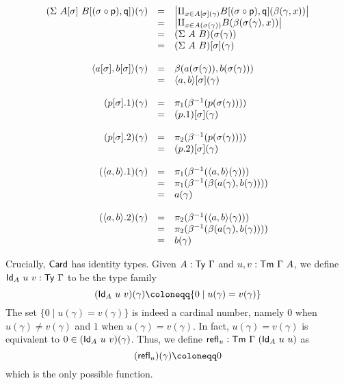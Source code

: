\[
  \begin{array}{rcl}
    (\Sigma\ A[\sigma]\ B[(\sigma \circ \mathsf{p}), \mathsf{q}])(\gamma)
    &=& \left|\amalg_{x \in A[\sigma](\gamma)} B[(\sigma \circ \mathsf{p}), \mathsf{q}](\beta(\gamma,x))\right| \\
    &=& \left|\amalg_{x \in A(\sigma(\gamma))} B(\beta(\sigma(\gamma), x))\right| \\
    &=& (\Sigma\ A\ B)(\sigma(\gamma)) \\
    &=& (\Sigma\ A\ B)[\sigma](\gamma) \\
    \\
    \langle a[\sigma], b[\sigma] \rangle(\gamma)
    &=& \beta(a(\sigma(\gamma)), b(\sigma(\gamma))) \\
    &=& \langle a,b \rangle[\sigma](\gamma) \\
    \\
    (p[\sigma].1)(\gamma)
    &=& \pi_1(\beta^{-1}(p(\sigma(\gamma)))) \\
    &=& (p.1)[\sigma](\gamma) \\
    \\
    (p[\sigma].2)(\gamma)
    &=& \pi_2(\beta^{-1}(p(\sigma(\gamma)))) \\
    &=& (p.2)[\sigma](\gamma) \\
    \\
    (\langle a,b \rangle.1)(\gamma)
    &=& \pi_1(\beta^{-1}(\langle a,b \rangle(\gamma))) \\
    &=& \pi_1(\beta^{-1}(\beta(a(\gamma), b(\gamma)))) \\
    &=& a(\gamma) \\
    \\
    (\langle a,b \rangle.2)(\gamma)
    &=& \pi_2(\beta^{-1}(\langle a,b \rangle(\gamma))) \\
    &=& \pi_2(\beta^{-1}(\beta(a(\gamma), b(\gamma)))) \\
    &=& b(\gamma)
  \end{array}
\]


Crucially, \(\mathsf{Card}\) has identity types.
Given \(A : \mathsf{Ty}\ \Gamma\) and \(u, v : \mathsf{Tm}\ \Gamma\ A\), we define
\(\mathsf{Id}_A\ u\ v : \mathsf{Ty}\ \Gamma\) to be the type family
\[
  (\CId_A\ u\ v)(\gamma) \coloneqq \{ 0 \mid u(\gamma) = v(\gamma) \}
\]
The set \(\{ 0 \mid u(\gamma) = v(\gamma) \}\) is indeed a cardinal number,
namely \(0\) when \(u(\gamma) \not= v(\gamma)\) and \(1\) when
\(u(\gamma) = v(\gamma)\).
In fact, \(u(\gamma) = v(\gamma)\) is equivalent to
\(0 \in (\CId_A\ u\ v)(\gamma)\).
Thus, we define \(\mathsf{refl}_u : \mathsf{Tm}\ \Gamma\ (\mathsf{Id}_A\ u\ u)\) as
\[
  (\crefl_u)(\gamma) \coloneqq 0
\]
which is the only possible function.


